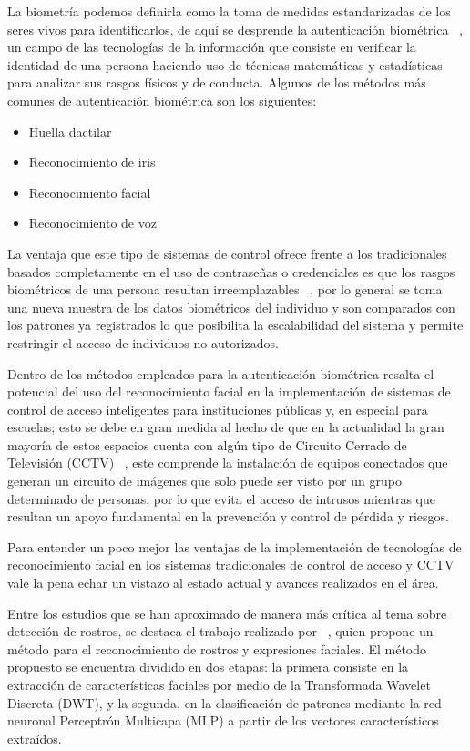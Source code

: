 La biometría podemos definirla como la toma de medidas estandarizadas de los seres vivos para identificarlos, de aquí se desprende la autenticación biométrica ~\cite{CALF}, un campo de las tecnologías de la información que consiste en verificar la identidad de una persona haciendo uso de técnicas matemáticas y estadísticas para analizar sus rasgos físicos y de conducta. Algunos de los métodos más comunes de autenticación biométrica son los siguientes:

\begin{itemize}
	\item Huella dactilar
	\item Reconocimiento de iris
	\item Reconocimiento facial
	\item Reconocimiento de voz
\end{itemize}

La ventaja que este tipo de sistemas de control ofrece frente a los tradicionales basados completamente en el uso de contraseñas o credenciales es que los rasgos biométricos de una persona resultan irreemplazables ~\cite{CALF}, por lo general se toma una nueva muestra de los datos biométricos del individuo y son comparados con los patrones ya registrados lo que posibilita la escalabilidad del sistema y permite restringir el acceso de individuos no autorizados.

Dentro de los métodos empleados para la autenticación biométrica resalta el potencial del uso del reconocimiento facial en la implementación de sistemas de control de acceso inteligentes para instituciones públicas y, en especial para escuelas; esto se debe en gran medida al hecho de que en la actualidad la gran mayoría de estos espacios cuenta con algún tipo de Circuito Cerrado de Televisión (CCTV) ~\cite{FacialR}, este comprende la instalación de equipos conectados que generan un circuito de imágenes que solo puede ser visto por un grupo determinado de personas, por lo que evita el acceso de intrusos mientras que resultan un apoyo fundamental en la prevención y control de pérdida y riesgos.

Para entender un poco mejor las ventajas de la implementación de tecnologías de reconocimiento facial en los sistemas tradicionales de control de acceso y CCTV vale la pena echar un vistazo al estado actual y avances realizados en el área.


Entre los estudios que se han aproximado de manera más crítica al tema sobre detección de rostros, se destaca el trabajo realizado por ~\cite{D3}, quien propone un método para el reconocimiento de rostros y expresiones faciales. El método propuesto se encuentra dividido en dos etapas: la primera consiste en la extracción de características faciales por medio de la Transformada Wavelet Discreta (DWT), y la segunda, en la clasificación de patrones mediante la red neuronal Perceptrón Multicapa (MLP) a partir de los vectores característicos extraídos.

